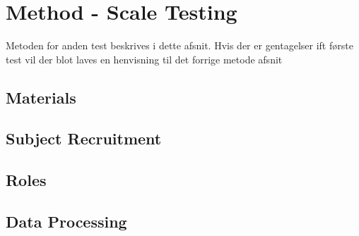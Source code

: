 \section{{\color{red}Method - Scale Testing}}
\label{MethodScaleTesting}
%
{\color{red} Metoden for anden test beskrives i dette afsnit. Hvis der er gentagelser ift første test vil der blot laves en henvisning til det forrige metode afsnit}
%
\subsection{{\color{red}Materials}}
\subsection{{\color{red}Subject Recruitment}}
\subsection{{\color{red}Roles}}
\subsection{{\color{red}Data Processing}}